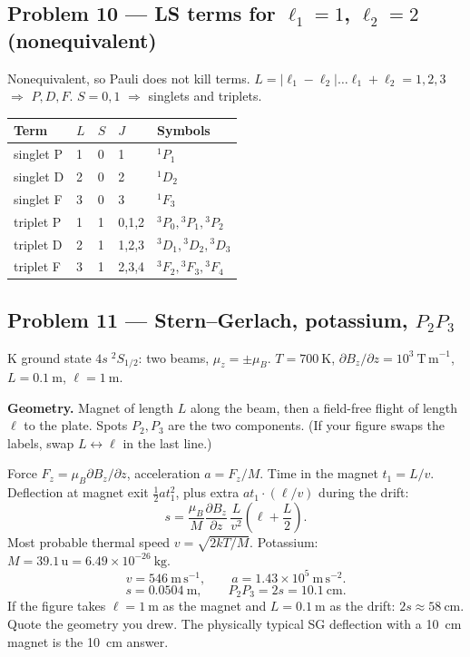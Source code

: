 \documentclass[11pt,a4paper]{article}
\begin{document}
\subsection{Problem 10 --- LS terms for \(\ell_1=1\), \(\ell_2=2\) (nonequivalent)}
Nonequivalent, so Pauli does not kill terms.
\(L=|\ell_1-\ell_2|\ldots \ell_1+\ell_2=1,2,3\) \(\Rightarrow\) \(P,D,F\).
\(S=0,1\) \(\Rightarrow\) singlets and triplets.

\begin{center}
\small
\begin{tabular}{@{}lllll@{}}
\toprule
Term & \(L\) & \(S\) & \(J\) & Symbols \\
\midrule
singlet P & 1 & 0 & 1 & \({}^1P_1\) \\
singlet D & 2 & 0 & 2 & \({}^1D_2\) \\
singlet F & 3 & 0 & 3 & \({}^1F_3\) \\
triplet P & 1 & 1 & 0,1,2 & \({}^3P_0,{}^3P_1,{}^3P_2\) \\
triplet D & 2 & 1 & 1,2,3 & \({}^3D_1,{}^3D_2,{}^3D_3\) \\
triplet F & 3 & 1 & 2,3,4 & \({}^3F_2,{}^3F_3,{}^3F_4\) \\
\bottomrule
\end{tabular}
\end{center}

\subsection{Problem 11 --- Stern--Gerlach, potassium, \(P_2P_3\)}
K ground state \(4s\;{}^2S_{1/2}\): two beams, \(\mu_z=\pm\mu_B\).
\(T=700~\mathrm{K}\), \(\partial B_z/\partial z=10^3~\mathrm{T\,m}^{-1}\), \(L=0.1~\mathrm{m}\), \(\ell=1~\mathrm{m}\).

\textbf{Geometry.} Magnet of length \(L\) along the beam, then a field-free flight of length \(\ell\) to the plate. Spots \(P_2,P_3\) are the two components. (If your figure swaps the labels, swap \(L\leftrightarrow\ell\) in the last line.)

Force \(F_z=\mu_B\partial B_z/\partial z\), acceleration \(a=F_z/M\). Time in the magnet \(t_1=L/v\). Deflection at magnet exit \(\tfrac12 a t_1^2\), plus extra \(a t_1\cdot(\ell/v)\) during the drift:
\[
s=\frac{\mu_B}{M}\frac{\partial B_z}{\partial z}\,\frac{L}{v^2}\left(\ell+\frac{L}{2}\right).
\]
Most probable thermal speed \(v=\sqrt{2kT/M}\). Potassium: \(M=39.1\,\mathrm{u}=6.49\times 10^{-26}~\mathrm{kg}\).
\[
v=546~\mathrm{m\,s}^{-1},\qquad a=1.43\times 10^5~\mathrm{m\,s}^{-2}.
\]
\[
s=0.0504~\mathrm{m},\qquad P_2P_3=2s=10.1~\mathrm{cm}.
\]
If the figure takes \(\ell=1~\mathrm{m}\) as the magnet and \(L=0.1~\mathrm{m}\) as the drift: \(2s\approx 58~\mathrm{cm}\). Quote the geometry you drew. The physically typical SG deflection with a 10~cm magnet is the 10~cm answer.
\end{document}
